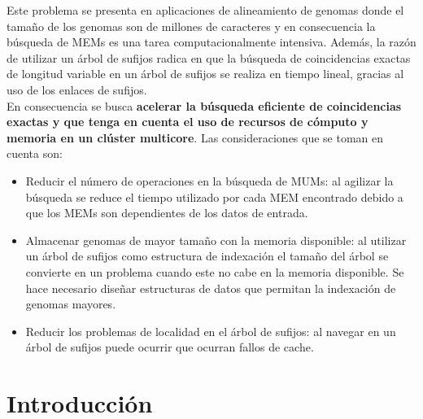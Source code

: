 \documentclass[12pt,a4paper]{article}
\begin{document}
\indent
Este problema se presenta en aplicaciones de alineamiento de genomas donde el tama\~no de los genomas son de millones de caracteres y en consecuencia la búsqueda de MEMs es una tarea computacionalmente intensiva. Además, la razón de utilizar un árbol de sufijos radica en que la búsqueda de coincidencias exactas de longitud variable en un árbol de 
sufijos se realiza en tiempo lineal, gracias al uso de los enlaces de sufijos.\\
\indent
En consecuencia se busca \textbf{acelerar la búsqueda eficiente de 
coincidencias exactas y que tenga en cuenta el uso de recursos de cómputo y
memoria en un clúster multicore}. Las consideraciones que se toman en cuenta son:
\begin{itemize}
\item Reducir el número de operaciones en la búsqueda de MUMs: al agilizar la búsqueda se reduce el tiempo utilizado por cada MEM encontrado debido a que los MEMs son dependientes de los datos de entrada.
\item Almacenar genomas de mayor tamaño con la memoria disponible: al utilizar un árbol de sufijos como estructura de indexación el tamaño del árbol se convierte en un problema cuando este no cabe en la memoria disponible. Se hace necesario diseñar estructuras de datos que permitan la indexación de genomas mayores.
\item Reducir los problemas de localidad en el árbol de sufijos: al navegar en un árbol de sufijos puede ocurrir que ocurran fallos de cache.
\end{itemize}
\section{Introducción} 
\end{document}
